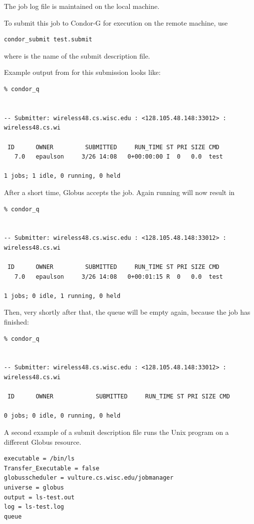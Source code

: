 The job log file is maintained on the local machine.

To submit this job to Condor-G for execution on the
remote machine, use
\begin{verbatim}
condor_submit test.submit
\end{verbatim}
where  is the name of the submit description file.

Example output from 
 for this submission looks like:
\footnotesize
\begin{verbatim}
% condor_q


-- Submitter: wireless48.cs.wisc.edu : <128.105.48.148:33012> : wireless48.cs.wi

 ID      OWNER         SUBMITTED     RUN_TIME ST PRI SIZE CMD
   7.0   epaulson     3/26 14:08   0+00:00:00 I  0   0.0  test

1 jobs; 1 idle, 0 running, 0 held
\end{verbatim}
\normalsize

After a short time, Globus accepts the job.
Again running  will now result in

\footnotesize
\begin{verbatim}
% condor_q


-- Submitter: wireless48.cs.wisc.edu : <128.105.48.148:33012> : wireless48.cs.wi

 ID      OWNER         SUBMITTED     RUN_TIME ST PRI SIZE CMD
   7.0   epaulson     3/26 14:08   0+00:01:15 R  0   0.0  test

1 jobs; 0 idle, 1 running, 0 held
\end{verbatim}
\normalsize

Then, very shortly after that, the queue will be empty again,
because the job has finished:

\footnotesize
\begin{verbatim}
% condor_q


-- Submitter: wireless48.cs.wisc.edu : <128.105.48.148:33012> : wireless48.cs.wi

 ID      OWNER            SUBMITTED     RUN_TIME ST PRI SIZE CMD

0 jobs; 0 idle, 0 running, 0 held
\end{verbatim}
\normalsize


A second example of a submit description file runs the Unix 
program on a different Globus resource.

\footnotesize
\begin{verbatim}
executable = /bin/ls
Transfer_Executable = false
globusscheduler = vulture.cs.wisc.edu/jobmanager
universe = globus
output = ls-test.out
log = ls-test.log
queue
\end{verbatim} 
\normalsize

